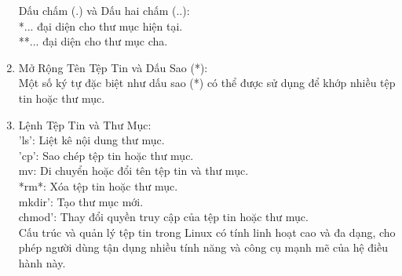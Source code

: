 \documentclass[12pt,a4paper]{article}
\begin{document}
\begin{enumerate}
	Dấu chấm (.) và Dấu hai chấm (..):\\
	*... đại diện cho thư mục hiện tại.\\
	**... đại diện cho thư mục cha.\\
	\item Mở Rộng Tên Tệp Tin và Dấu Sao (*):\\
	Một số ký tự đặc biệt như dấu sao (*) có thể được sử dụng để khớp nhiều tệp tin hoặc thư mục.
	\item Lệnh Tệp Tin và Thư Mục:\\
	'ls': Liệt kê nội dung thư mục.\\
	'cp': Sao chép tệp tin hoặc thư mục.\\
	mv: Di chuyển hoặc đổi tên tệp tin và thư mục.\\
	*rm*: Xóa tệp tin hoặc thư mục.\\
	mkdir': Tạo thư mục mới.\\
	chmod': Thay đổi quyền truy cập của tệp tin hoặc thư mục.\\
	Cấu trúc và quản lý tệp tin trong Linux có tính linh hoạt cao và đa dạng, cho phép người dùng tận dụng nhiều tính năng và công cụ mạnh mẽ của hệ điều hành này.
\end{enumerate}
\end{document}
